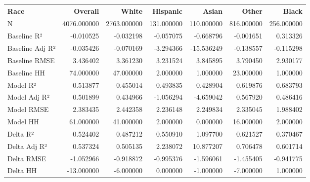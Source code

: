 \begin{tabular}{lrrrrrr}
\toprule
Race &      Overall &        White &    Hispanic &       Asian &       Other &       Black \\
\midrule
N               &  4076.000000 &  2763.000000 &  131.000000 &  110.000000 &  816.000000 &  256.000000 \\
Baseline R²     &    -0.010525 &    -0.032198 &   -0.057075 &   -0.668796 &   -0.001651 &    0.313326 \\
Baseline Adj R² &    -0.035426 &    -0.070169 &   -3.294366 &  -15.536249 &   -0.138557 &   -0.115298 \\
Baseline RMSE   &     3.436402 &     3.361230 &    3.231524 &    3.845895 &    3.790450 &    2.930177 \\
Baseline HH     &    74.000000 &    47.000000 &    2.000000 &    1.000000 &   23.000000 &    1.000000 \\
Model R²        &     0.513877 &     0.455014 &    0.493835 &    0.428904 &    0.619876 &    0.683793 \\
Model Adj R²    &     0.501899 &     0.434966 &   -1.056294 &   -4.659042 &    0.567920 &    0.486416 \\
Model RMSE      &     2.383435 &     2.442358 &    2.236148 &    2.249834 &    2.335045 &    1.988402 \\
Model HH        &    61.000000 &    41.000000 &    2.000000 &    0.000000 &   16.000000 &    2.000000 \\
Delta R²        &     0.524402 &     0.487212 &    0.550910 &    1.097700 &    0.621527 &    0.370467 \\
Delta Adj R²    &     0.537324 &     0.505135 &    2.238072 &   10.877207 &    0.706478 &    0.601714 \\
Delta RMSE      &    -1.052966 &    -0.918872 &   -0.995376 &   -1.596061 &   -1.455405 &   -0.941775 \\
Delta HH        &   -13.000000 &    -6.000000 &    0.000000 &   -1.000000 &   -7.000000 &    1.000000 \\
\bottomrule
\end{tabular}
